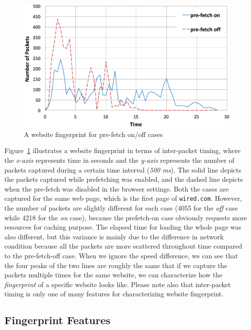 \begin{figure}[H]
\includegraphics[width=0.95\columnwidth]{figures/prefetch.png}
\centering
\caption{A website fingerprint for pre-fetch on/off cases}
\label{fig:prefetch}
\end{figure}

Figure~\ref{fig:prefetch} illustrates a website fingerprint in terms of inter-packet timing, where the {\it x-axis} represents time in seconds and the {\it y-axis} represents the number of packets captured during a certain time interval ({\it 500 ms}).
The solid line depicts the packets captured while prefetching was enabled, and the dashed line depicts when the pre-fetch was disabled in the browser settings.
Both the cases are captured for the same web page, which is the first page of {\tt wired.com}.
However, the number of packets are slightly different for each case (4055 for the {\it off} case while 4218 for the {\it on} case), because the prefetch-on case obviously requests more resources for caching purpose. 
The elapsed time for loading the whole page was also different, but this variance is mainly due to the difference in network condition because all the packets are more scattered throughout time compared to the pre-fetch-off case.
When we ignore the speed difference, we can see that the four peaks of the two lines are roughly the same that if we capture the packets multiple times for the same website, we can characterize how the {\it fingerprint} of a specific website looks like.
Please note also that inter-packet timing is only one of many features for characterizing website fingerprint.


\subsection{Fingerprint Features}
\label{sec:features}

